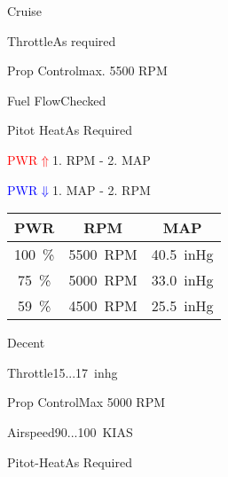 \begin{checklist}{Cruise}
  \item{Throttle}{As required}
  \item{Prop Control}{max. 5500 RPM}
  \item{Fuel Flow}{Checked}
  \item{Pitot Heat}{As Required}

  \item{\textcolor{red}{PWR$\Uparrow$}}{1. RPM - 2. MAP}
  \item{\textcolor{blue}{PWR$\Downarrow$}}{1. MAP - 2. RPM}
    
\end{checklist}

\begin{table}[!ht]
  \centering
  \begin{tabular}{|c|c|c|}
  \hline
  \cellcolor{black!90}\color{white}\textbf{PWR} & \cellcolor{black!90}\color{white}\textbf{RPM}  & \cellcolor{black!90}\color{white}\textbf{MAP} \\ \hline

  100~\% & 5500~RPM & 40.5~inHg \\ \hline
  75~\% & 5000~RPM & 33.0~inHg \\ \hline
  59~\% & 4500~RPM & 25.5~inHg \\ \hline

  \end{tabular}
\end{table}


\begin{checklist}{Decent}
  \item{Throttle}{15...17~inhg}
  \item{Prop Control}{Max 5000 RPM}
  \item{Airspeed}{90...100~KIAS}
  \item{Pitot-Heat}{As Required}
\end{checklist}

